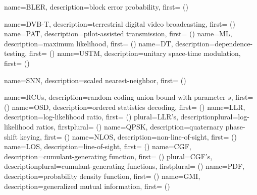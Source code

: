 {
  name={BLER},
  description={block error probability},
  first={ ()}
}



{
  name={DVB-T},
  description={terrestrial digital video broadcasting},
  first={ ()}
}
{
  name={PAT},
  description={pilot-assisted transmission},
  first={ ()}
}
{
  name={ML},
  description={maximum likelihood},
  first={ ()}
}
{
  name={DT},
  description={dependence-testing},
  first={ ()}
}
{
  name={USTM},
  description={unitary space-time modulation},
  first={ ()}
}

{
  name={SNN},
  description={scaled nearest-neighbor},
  first={ ()}
}


{
  name={RCUs},
  description={random-coding union bound with parameter $s$},
  first={ ()}
}
{
  name={OSD},
  description={ordered statistics decoding},
  first={ ()}
}
{
  name={LLR},
  description={log-likelihood ratio},
  first={ ()}
   plural={LLR's},
  descriptionplural={log-likelihood ratios},
  firstplural={ ()}
}
{
  name={QPSK},
  description={quaternary phase-shift keying},
  first={ ()}
}
{
  name={NLOS},
  description={non-line-of-sight},
  first={ ()}
}
{
  name={LOS},
  description={line-of-sight},
  first={ ()}
}
{
  name={CGF},
  description={cumulant-generating function},
  first={ ()}
   plural={CGF's},
  descriptionplural={cumulant-generating functions},
  firstplural={ ()}
}
{
  name={PDF},
  description={probability density function},
  first={ ()}
}
{
  name={GMI},
  description={generalized mutual information},
  first={ ()}
}

